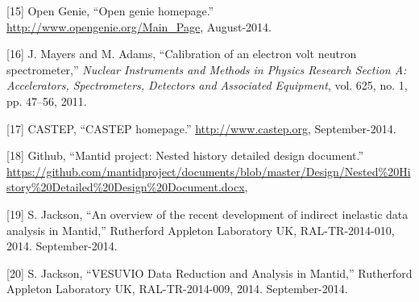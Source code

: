 \documentclass[paper=a4, fontsize=11pt]{scrartcl}	%
\numberwithin{equation}{section}															%
\numberwithin{figure}{section}																%
\numberwithin{table}{section}
\begin{document}
{[}15{]} Open Genie, ``Open genie homepage.''
\url{http://www.opengenie.org/Main_Page}, August-2014.

{[}16{]} J. Mayers and M. Adams, ``Calibration of an electron volt
neutron spectrometer,'' \emph{Nuclear Instruments and Methods in Physics
Research Section A: Accelerators, Spectrometers, Detectors and
Associated Equipment}, vol. 625, no. 1, pp. 47--56, 2011.

{[}17{]} CASTEP, ``CASTEP homepage.'' \url{http://www.castep.org},
September-2014.

{[}18{]} Github, ``Mantid project: Nested history detailed design
document.''
\url{https://github.com/mantidproject/documents/blob/master/Design/Nested\%20History\%20Detailed\%20Design\%20Document.docx},

{[}19{]} S. Jackson, ``An overview of the recent development of indirect inelastic data analysis in Mantid,''
Rutherford Appleton Laboratory UK, RAL-TR-2014-010, 2014.
September-2014.

{[}20{]} S. Jackson, ``VESUVIO Data Reduction and Analysis in Mantid,''
Rutherford Appleton Laboratory UK, RAL-TR-2014-009, 2014.
September-2014.
\end{document}
